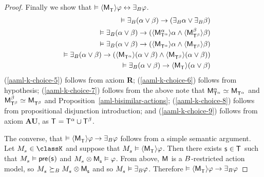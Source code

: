 \begin{proof}
Finally we show that $\entails \actionE{\aPModel{\aStatesT}} \phi \iff \someactsBs \phi$.
\begin{eqnarray}
    &&\entails \someactsBs (\alpha \lor \beta) \implies (\someactsBs \alpha \lor \someactsBs \beta) \label{aaml-k-choice-5}\\
    &&\entails \someactsBs (\alpha \lor \beta) \implies (\actionE{\aPModel[\alpha]{\aStatesT[\alpha]}} \alpha \land \actionE{\aPModel[\beta]{\aStatesT[\beta]}} \beta) \label{aaml-k-choice-6}\\
    &&\entails \someactsBs (\alpha \lor \beta) \implies (\actionE{\aPModel{\aStatesT[\alpha]}} \alpha \land \actionE{\aPModel{\aStatesT[\beta]}} \beta) \label{aaml-k-choice-7}\\
    &&\entails \someactsBs (\alpha \lor \beta) \implies (\actionE{\aPModel{\aStatesT[\alpha]}} (\alpha \lor \beta) \land \actionE{\aPModel{\aStatesT[\beta]}} (\alpha \lor \beta)) \label{aaml-k-choice-8}\\
    &&\entails \someactsBs (\alpha \lor \beta) \implies \actionE{\aPModel{\aStatesT}} (\alpha \lor \beta) \label{aaml-k-choice-9}
\end{eqnarray}
(\ref{aaml-k-choice-5}) follows from \axiomAamlK{} axiom {\bf R};
(\ref{aaml-k-choice-6}) follows from hypothesis;
(\ref{aaml-k-choice-7}) follows from the above note that $\aPModel[\alpha]{\aStatesT[\alpha]} \bisimilar \aPModel{\aStatesT[\alpha]}$ and $\aPModel[\beta]{\aStatesT[\beta]} \bisimilar \aPModel{\aStatesT[\beta]}$ and Proposition~\ref{aml-bisimilar-actions};
(\ref{aaml-k-choice-8}) follows from propositional disjunction introduction; and
(\ref{aaml-k-choice-9}) follows from \axiomAamlK{} axiom {\bf AU}, as $\aStatesT = \aStatesT[\alpha] \cup \aStatesT[\beta]$.

The converse, that $\entails \actionE{\aPModel{\aStatesT}} \phi \implies \someactsBs \phi$ follows from a simple semantic argument.
Let $\kPModel{\kStateS} \in \classK$ and suppose that $\kPModel{\kStateS} \entails \actionE{\aPModel{\aStatesT}} \phi$.
Then there exists $\aStateS \in \aStatesT$ such that $\kPModel{\kStateS} \entails \aPrecondition(\aStateS)$ and $\kPModel{\kStateS} \exec \aPModel{\aStateS} \entails \phi$.
From above, $\aModel$ is a $B$-restricted action model, so $\kPModel{\kStateS} \simulatesBs \kPModel{\kStateS} \exec \aPModel{\aStateS}$ and so $\kPModel{\kStateS} \entails \someactsBs \phi$.
Therefore $\entails \actionE{\aPModel{\aStatesT}} \phi \implies \someactsBs \phi$
\end{proof}

